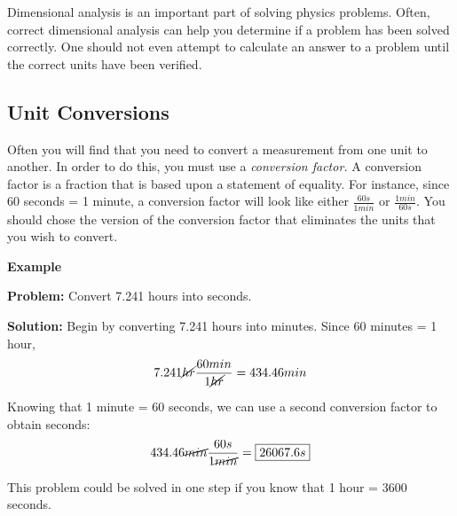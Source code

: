 	Dimensional analysis is an important part of solving physics problems.  Often, correct dimensional analysis can help you determine if a problem has been solved correctly.  One should not even attempt to calculate an answer to a problem until the correct units have been verified. 

	\subsection{Unit Conversions} 
	Often you will find that you need to convert a measurement from one unit to another.  In order to do this, you must use a \textit{conversion factor.}  A conversion factor is a fraction that is based upon a statement of equality.  For instance, since 60 seconds = 1 minute, a conversion factor will look like either $\frac{60s}{1 min}$ or $\frac{1 min}{60s}$.  You should chose the version of the conversion factor that eliminates the units that you wish to convert.  
	
	
		\begin{mdframed}[backgroundcolor=blue!10!white]
		\begin{center}
			\textbf{Example \thesubsection}	\label{ex113}
		\end{center}
	
		\vspace{0.1in}	
		\textbf{Problem:} Convert 7.241 hours into seconds. 
		\vspace{0.1in}
		
		\textbf{Solution:} Begin by converting 7.241 hours into minutes.  Since 60 minutes = 1 hour, 
			\begin{equation*}
			7.241 \cancel{hr} \frac{60 min}{1 \cancel{hr}} = 434.46 min
			\end{equation*}
		
		Knowing that 1 minute = 60 seconds, we can use a second conversion factor to obtain seconds:
			\begin{equation*}
			434.46 \cancel{min} \frac{60 s}{1 \cancel{min}} = \boxed{26067.6s}
			\end{equation*}
		
		This problem could be solved in one step if you know that 1 hour = 3600 seconds. 
	
	\end{mdframed}



